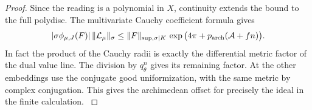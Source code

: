\begin{proof}
Since the reading is a polynomial in \(X\),
continuity extends the bound to the full polydisc.
The multivariate Cauchy coefficient formula gives
\[
 |\sigma\phi_{\mu,J}(F)|\,\|\mathcal L_\mu\|_\sigma
 \le \|F\|_{\sup,\sigma|K}\,
       \exp\big(4\pi+p_{\rm arch}(\mathcal A+fn)\big).
\]
In fact the product of the Cauchy radii is exactly the
differential metric factor of the dual value line. The
division by \(q_\theta^n\) gives its remaining factor.
At the other embeddings use the conjugate good
uniformization, with the same metric by complex
conjugation. This gives the archimedean offset for precisely
the ideal in the finite calculation.
\label{cor:slice-cm-coefficients-7}
\end{proof}
